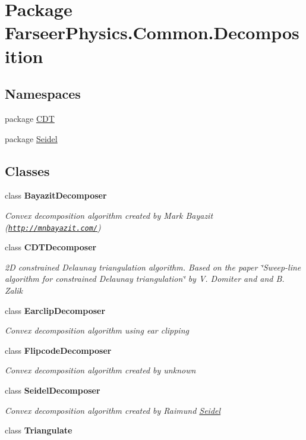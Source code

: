 \hypertarget{namespace_farseer_physics_1_1_common_1_1_decomposition}{\section{Package Farseer\+Physics.\+Common.\+Decomposition}
\label{namespace_farseer_physics_1_1_common_1_1_decomposition}
}
\subsection*{Namespaces}
\begin{DoxyCompactItemize}
\item 
package \hyperlink{namespace_farseer_physics_1_1_common_1_1_decomposition_1_1_c_d_t}{C\+D\+T}
\item 
package \hyperlink{namespace_farseer_physics_1_1_common_1_1_decomposition_1_1_seidel}{Seidel}
\end{DoxyCompactItemize}
\subsection*{Classes}
\begin{DoxyCompactItemize}
\item 
class {\bfseries Bayazit\+Decomposer}
\begin{DoxyCompactList}\small\item\em Convex decomposition algorithm created by Mark Bayazit (\href{http://mnbayazit.com/}{\tt http\+://mnbayazit.\+com/}) \end{DoxyCompactList}\item 
class {\bfseries C\+D\+T\+Decomposer}
\begin{DoxyCompactList}\small\item\em 2\+D constrained Delaunay triangulation algorithm. Based on the paper \char`\"{}\+Sweep-\/line algorithm for constrained Delaunay triangulation\char`\"{} by V. Domiter and and B. Zalik \end{DoxyCompactList}\item 
class {\bfseries Earclip\+Decomposer}
\begin{DoxyCompactList}\small\item\em Convex decomposition algorithm using ear clipping \end{DoxyCompactList}\item 
class {\bfseries Flipcode\+Decomposer}
\begin{DoxyCompactList}\small\item\em Convex decomposition algorithm created by unknown \end{DoxyCompactList}\item 
class {\bfseries Seidel\+Decomposer}
\begin{DoxyCompactList}\small\item\em Convex decomposition algorithm created by Raimund \hyperlink{namespace_farseer_physics_1_1_common_1_1_decomposition_1_1_seidel}{Seidel} \end{DoxyCompactList}\item 
class {\bfseries Triangulate}
\end{DoxyCompactItemize}
